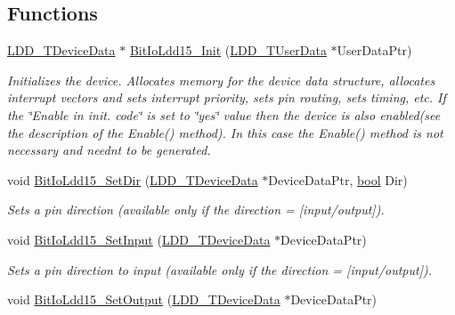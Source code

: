 \subsection*{Functions}
\begin{DoxyCompactItemize}
\item 
\hyperlink{group___p_e___types__module_gac5cf1362f1f0e3a2ce71b1bf2276d091}{L\+D\+D\+\_\+\+T\+Device\+Data} $\ast$ \hyperlink{group___bit_io_ldd15__module_gae933572e69dc3cc23725af8444104156}{Bit\+Io\+Ldd15\+\_\+\+Init} (\hyperlink{group___p_e___types__module_ga0b66a73f87238a782318aa0be7578e35}{L\+D\+D\+\_\+\+T\+User\+Data} $\ast$User\+Data\+Ptr)
\begin{DoxyCompactList}\small\item\em Initializes the device. Allocates memory for the device data structure, allocates interrupt vectors and sets interrupt priority, sets pin routing, sets timing, etc. If the \char`\"{}\+Enable
    in init. code\char`\"{} is set to \char`\"{}yes\char`\"{} value then the device is also enabled(see the description of the Enable() method). In this case the Enable() method is not necessary and needn\textquotesingle{}t to be generated. \end{DoxyCompactList}\item 
void \hyperlink{group___bit_io_ldd15__module_gaa625d107e194a1e065b8a51f20545860}{Bit\+Io\+Ldd15\+\_\+\+Set\+Dir} (\hyperlink{group___p_e___types__module_gac5cf1362f1f0e3a2ce71b1bf2276d091}{L\+D\+D\+\_\+\+T\+Device\+Data} $\ast$Device\+Data\+Ptr, \hyperlink{group___p_e___types__module_ga97a80ca1602ebf2303258971a2c938e2}{bool} Dir)
\begin{DoxyCompactList}\small\item\em Sets a pin direction (available only if the direction = {\itshape \mbox{[}input/output\mbox{]}}). \end{DoxyCompactList}\item 
void \hyperlink{group___bit_io_ldd15__module_gada439e248c981dbaf15efd269de4d4d2}{Bit\+Io\+Ldd15\+\_\+\+Set\+Input} (\hyperlink{group___p_e___types__module_gac5cf1362f1f0e3a2ce71b1bf2276d091}{L\+D\+D\+\_\+\+T\+Device\+Data} $\ast$Device\+Data\+Ptr)
\begin{DoxyCompactList}\small\item\em Sets a pin direction to input (available only if the direction = {\itshape \mbox{[}input/output\mbox{]}}). \end{DoxyCompactList}\item 
void \hyperlink{group___bit_io_ldd15__module_ga507454e3c3f8d84768c97902fad489a1}{Bit\+Io\+Ldd15\+\_\+\+Set\+Output} (\hyperlink{group___p_e___types__module_gac5cf1362f1f0e3a2ce71b1bf2276d091}{L\+D\+D\+\_\+\+T\+Device\+Data} $\ast$Device\+Data\+Ptr)

\end{DoxyCompactItemize}
